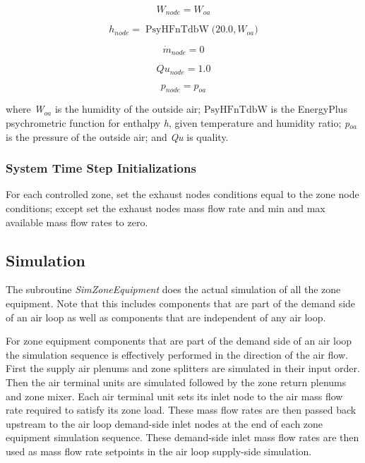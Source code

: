 \begin{equation}
{W_{node}} = {W_{oa}}
\end{equation}

\begin{equation}
{h_{node}} = \operatorname{PsyHFnTdbW} {\mathrm{(}}20.0,{W_{oa}}{\mathrm{)}}
\end{equation}

\begin{equation}
{\dot m_{node}} = 0
\end{equation}

\begin{equation}
Q{u_{node}} = 1.0
\end{equation}

\begin{equation}
{p_{node}} = {p_{oa}}
\end{equation}

where \emph{W\(_{oa}\)} is the humidity of the outside air; \({\mathrm{PsyHFnTdbW}}\) is the EnergyPlus psychrometric function for enthalpy \emph{h}, given temperature and humidity ratio; \emph{p\(_{oa}\)} is the pressure of the outside air; and \emph{Qu} is quality.

\subsubsection{System Time Step Initializations}\label{system-time-step-initializations-000}

For each controlled zone, set the exhaust nodes conditions equal to the zone node conditions; except set the exhaust nodes mass flow rate and min and max available mass flow rates to zero.

\subsection{Simulation}\label{simulation-003}

The subroutine \emph{SimZoneEquipment} does the actual simulation of all the zone equipment. Note that this includes components that are part of the demand side of an air loop as well as components that are independent of any air loop.

For zone equipment components that are part of the demand side of an air loop the simulation sequence is effectively performed in the direction of the air flow. First the supply air plenums and zone splitters are simulated in their input order. Then the air terminal units are simulated followed by the zone return plenums and zone mixer. Each air terminal unit sets its inlet node to the air mass flow rate required to satisfy its zone load. These mass flow rates are then passed back upstream to the air loop demand-side inlet nodes at the end of each zone equipment simulation sequence. These demand-side inlet mass flow rates are then used as mass flow rate setpoints in the air loop supply-side simulation.

